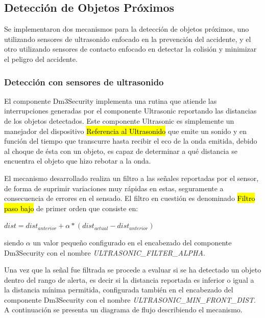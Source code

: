 \documentclass[withindex,glossary]{cam-thesis}
\begin{document}
\subsection{Detección de Objetos Próximos} \label{sec:Implementacion :: detección de objetos próximos}
Se implementaron dos mecanismos para la detección de objetos próximos, uno utilizando sensores de ultrasonido enfocado en la prevención del accidente, y el otro utilizando sensores de contacto enfocado en detectar la colisión y minimizar el peligro del accidente.

\subsubsection{Detección con sensores de ultrasonido}
El componente Dm3Security implementa una rutina que atiende las interrupciones generadas por el componente Ultrasonic reportando las distancias de los objetos detectados. Este componente Ultrasonic es simplemente un manejador del dispositivo \hl{Referencia al Ultrasonido} que emite un sonido y en función del tiempo que transcurre hasta recibir el eco de la onda emitida, debido al choque de ésta con un objeto, es capaz de determinar a qué distancia se encuentra el objeto que hizo rebotar a la onda.

El mecanismo desarrollado realiza un filtro a las señales reportadas por el sensor, de forma de suprimir variaciones muy rápidas en estas, seguramente a consecuencia de errores en el sensado. El filtro en cuestión es denominado \hl{Filtro paso bajo} de primer orden que consiste en:

\begin{center}
$dist = dist_{anterior} + \alpha * (dist_{actual} - dist_{anterior})$ 
\end{center}
siendo $\alpha$ un valor pequeño configurado en el encabezado del componente Dm3Security con el nombre \textit{ULTRASONIC\_FILTER\_ALPHA}.

Una vez que la señal fue filtrada se procede a evaluar si se ha detectado un objeto dentro del rango de alerta, es decir si la distancia reportada es inferior o igual a la distancia mínima permitida, configurada también en el encabezado del componente Dm3Security con el nombre \textit{ULTRASONIC\_MIN\_FRONT\_DIST}. A continuación se presenta un diagrama de flujo describiendo el mecanismo.
\end{document}
